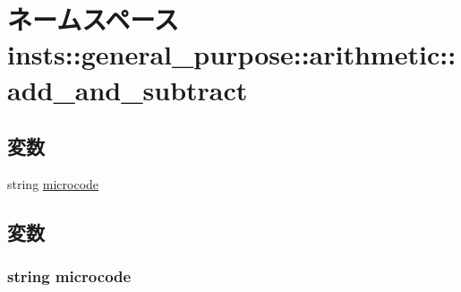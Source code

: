 \hypertarget{namespaceinsts_1_1general__purpose_1_1arithmetic_1_1add__and__subtract}{
\section{ネームスペース insts::general\_\-purpose::arithmetic::add\_\-and\_\-subtract}
\label{namespaceinsts_1_1general__purpose_1_1arithmetic_1_1add__and__subtract}
}
\subsection*{変数}
\begin{DoxyCompactItemize}
\item 
string \hyperlink{namespaceinsts_1_1general__purpose_1_1arithmetic_1_1add__and__subtract_a770f11a173e99389a8802f0107ed8f52}{microcode}
\end{DoxyCompactItemize}


\subsection{変数}
\hypertarget{namespaceinsts_1_1general__purpose_1_1arithmetic_1_1add__and__subtract_a770f11a173e99389a8802f0107ed8f52}{
\subsubsection[{microcode}]{\setlength{\rightskip}{0pt plus 5cm}string {\bf microcode}}}
\label{namespaceinsts_1_1general__purpose_1_1arithmetic_1_1add__and__subtract_a770f11a173e99389a8802f0107ed8f52}

